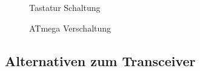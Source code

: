 \begin{figure}[H]
    \centering    
    \caption{Tastatur Schaltung}
    \label{Tastatur}
\end{figure}


\begin{figure}[H]
    \centering    
    \caption{ATmega Verschaltung}
    \label{AtMega}
\end{figure}


\subsection{Alternativen zum Transceiver}

